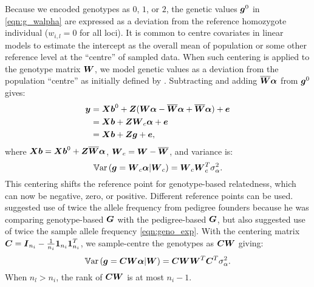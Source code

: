 Because we encoded genotypes as $0$, $1$, or $2$, the genetic values
$\boldsymbol{g}^0$ in \eqref{eqn:g_walpha} are expressed as a deviation from
the reference homozygote individual ($w_{i,l}=0$ for all loci).
%
It is common to centre covariates in linear models to estimate the intercept
as the overall mean of population or some other reference level at the
``centre'' of sampled data.
%
When such centering is applied to the genotype matrix $\boldsymbol{W}$, we model
genetic values as a deviation from the population ``centre'' as initially
defined by \cite{fisher1919correlation}.
%
Subtracting and adding $\overline{\boldsymbol{W}}\boldsymbol{\alpha}$ from
$\boldsymbol{g}^0$ gives:
%
\begin{align} \label{eqn:fisher_pheno_mat_walpha}
  \boldsymbol{y} & = \boldsymbol{Xb}^0 + \boldsymbol{Z}(\boldsymbol{W}\boldsymbol{\alpha}
                             - \overline{\boldsymbol{W}}\boldsymbol{\alpha}
                             + \overline{\boldsymbol{W}}\boldsymbol{\alpha})
                             + \boldsymbol{e} \notag \\ 
            & = \boldsymbol{Xb} + \boldsymbol{Z}\boldsymbol{W}_c\boldsymbol{\alpha} + \boldsymbol{e} \notag \\
            & = \boldsymbol{Xb} + \boldsymbol{Z}\boldsymbol{g} + \boldsymbol{e},
\end{align}
%
where
$\boldsymbol{Xb} = \boldsymbol{Xb}^0 + \boldsymbol{Z}\overline{\boldsymbol{W}}\boldsymbol{\alpha}$,
$\boldsymbol{W}_c = \boldsymbol{W} - \overline{\boldsymbol{W}}$,
and variance is:
%
\begin{equation} \label{eqn:WcWcT}
  \mathbb{V}\text{ar}\left(\boldsymbol{g}=\boldsymbol{W}_c\boldsymbol{\alpha} | \boldsymbol{W}_c\right) = \boldsymbol{W}_c\boldsymbol{W}_c^T\sigma_{\alpha}^2.
\end{equation}
%
This centering shifts the reference point for genotype-based relatedness, 
which can now be negative, zero, or positive.
%
Different reference points can be used.
%
\cite{vanraden2008efficient} suggested use of twice the allele frequency
from pedigree founders because he was comparing genotype-based $\boldsymbol{G}$
with the pedigree-based $\boldsymbol{G}$, but also suggested use of twice the
sample allele frequency \eqref{eqn:geno_exp}.
%
With the centering matrix $\boldsymbol{C}=\boldsymbol{I}_{n_i} - \frac{1}{n_i}\boldsymbol{1}_{n_i}\boldsymbol{1}_{n_i}^T$,
we sample-centre the genotypes as $\boldsymbol{C}\boldsymbol{W}$ giving:
%
\begin{equation} \label{eqn:CWWTCT}
  \mathbb{V}\text{ar}\left(\boldsymbol{g}=\boldsymbol{C}\boldsymbol{W}\boldsymbol{\alpha} | \boldsymbol{W}\right) = \boldsymbol{C}\boldsymbol{W}\boldsymbol{W}^T\boldsymbol{C}^T\sigma_{\alpha}^2.
\end{equation}
%
When $n_l > n_i$, the rank of $\boldsymbol{C}\boldsymbol{W}$ is at most $n_i - 1$.
